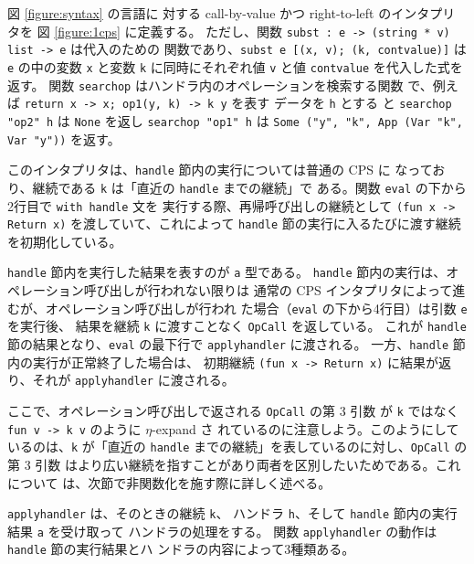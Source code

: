 図 \ref{figure:syntax} の言語に
対する call-by-value かつ right-to-left のインタプリタを
図 \ref{figure:1cps} に定義する。
ただし、関数 \texttt{subst :\ e -> (string * v) list -> e} は代入のための
関数であり、\texttt{subst e [(x, v); (k, cont\US{}value)]} は \texttt{e}
の中の変数 \texttt{x} と変数 \texttt{k} に同時にそれぞれ値 \texttt{v}
と値 \texttt{cont\US{}value} を代入した式を返す。
関数 \texttt{search\US{}op} はハンドラ内のオペレーションを検索する関数
で、例えば \texttt{\LBR{}return x -> x; op1(y, k) -> k y\RBR} を表す
データを \texttt{h} とする
と \texttt{search\US{}op "op2" h} は \texttt{None} を返し
\texttt{search\US{}op "op1" h} は \texttt{Some ("y", "k", App (Var "k", Var
"y"))} を返す。

このインタプリタは、\texttt{handle} 節内の実行については普通の CPS に
なっており、継続である \texttt{k} は「直近の \texttt{handle} までの継続」で
ある。関数 \texttt{eval} の下から2行目で \texttt{with handle} 文を
実行する際、再帰呼び出しの継続として
\texttt{(fun x -> Return x)} を渡していて、これによって
\texttt{handle} 節の実行に入るたびに渡す継続を初期化している。


\texttt{handle} 節内を実行した結果を表すのが \texttt{a} 型である。
\texttt{handle} 節内の実行は、オペレーション呼び出しが行われない限りは
通常の CPS インタプリタによって進むが、オペレーション呼び出しが行われ
た場合（\texttt{eval} の下から4行目）は引数 \texttt{e} を実行後、
結果を継続 \texttt{k} に渡すことなく \texttt{OpCall} を返している。
これが \texttt{handle} 節の結果となり、\texttt{eval} の最下行で
\texttt{apply\US{}handler} に渡される。
一方、\texttt{handle} 節内の実行が正常終了した場合は、
初期継続 \texttt{(fun x -> Return x)} に結果が返り、それが
\texttt{apply\US{}handler} に渡される。

ここで、オペレーション呼び出しで返される \texttt{OpCall} の第 3 引数
が \texttt{k} ではなく \texttt{fun v -> k v} のように $\eta$-expand さ
れているのに注意しよう。このようにしているのは、\texttt{k} が「直近の
\texttt{handle} までの継続」を表しているのに対し、\texttt{OpCall} の第 3 引数
はより広い継続を指すことがあり両者を区別したいためである。これについて
は、次節で非関数化を施す際に詳しく述べる。

\texttt{apply\US{}handler} は、そのときの継続 \texttt{k}、
ハンドラ \texttt{h}、そして
\texttt{handle} 節内の実行結果 \texttt{a} を受け取って
ハンドラの処理をする。
関数 \texttt{apply\US{}handler} の動作は \texttt{handle} 節の実行結果とハ
ンドラの内容によって3種類ある。

